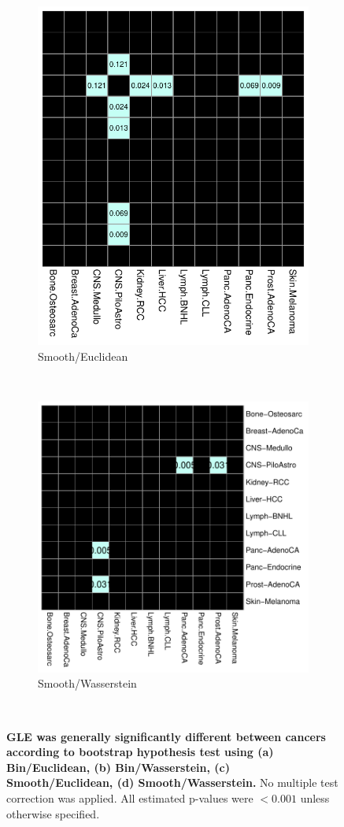 \begin{figure}[ht!]
    \begin{subfigure}{.5\textwidth}
    \includegraphics[width=\linewidth,height=0.7\textwidth]{graphics/bootstrap_smooth_euclidean.pdf}
    \caption{Smooth/Euclidean}
    \label{fig:bootstrap_smooth_euclidean}
    \end{subfigure}
    ~
    \begin{subfigure}{.5\textwidth}
    \includegraphics[width=\linewidth,height=0.7\textwidth]{graphics/bootstrap_smooth_wasserstein.pdf}
    \caption{Smooth/Wasserstein}
    \label{fig:smooth_wasserstein}
    \end{subfigure} \\
    
    \caption{\textbf{GLE was generally significantly different between cancers according to bootstrap hypothesis test using (a) Bin/Euclidean, (b) Bin/Wasserstein, (c) Smooth/Euclidean, (d) Smooth/Wasserstein.} No multiple test correction was applied. All estimated p-values were $<0.001$ unless otherwise specified.}
    \label{fig:bootstrap}
\end{figure}